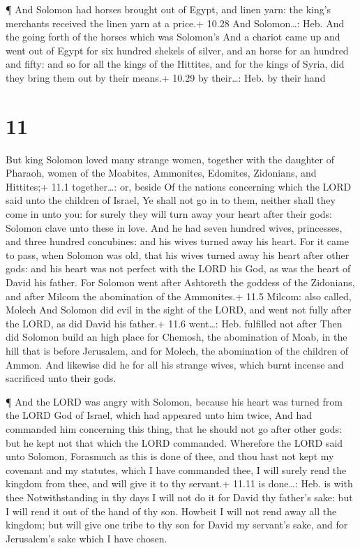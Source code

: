  ¶ And Solomon had horses brought out of Egypt, and linen
yarn: the king's merchants received the linen yarn at a price.+ 10.28
And Solomon\ldots: Heb. And the going forth of the horses which was
Solomon's  And a chariot came up and went out of Egypt for
six hundred shekels of silver, and an horse for an hundred and fifty:
and so for all the kings of the Hittites, and for the kings of Syria,
did they bring them out by their means.+ 10.29 by their\ldots: Heb. by
their hand

\hypertarget{section-10}{%
\section{11}\label{section-10}}

 But king Solomon loved many strange women, together with
the daughter of Pharaoh, women of the Moabites, Ammonites, Edomites,
Zidonians, and Hittites;+ 11.1 together\ldots: or, beside 
Of the nations concerning which the LORD said unto the children of
Israel, Ye shall not go in to them, neither shall they come in unto you:
for surely they will turn away your heart after their gods: Solomon
clave unto these in love.  And he had seven hundred wives,
princesses, and three hundred concubines: and his wives turned away his
heart.  For it came to pass, when Solomon was old, that his
wives turned away his heart after other gods: and his heart was not
perfect with the LORD his God, as was the heart of David his father.
 For Solomon went after Ashtoreth the goddess of the
Zidonians, and after Milcom the abomination of the Ammonites.+ 11.5
Milcom: also called, Molech  And Solomon did evil in the
sight of the LORD, and went not fully after the LORD, as did David his
father.+ 11.6 went\ldots: Heb. fulfilled not after  Then did
Solomon build an high place for Chemosh, the abomination of Moab, in the
hill that is before Jerusalem, and for Molech, the abomination of the
children of Ammon.  And likewise did he for all his strange
wives, which burnt incense and sacrificed unto their gods.

 ¶ And the LORD was angry with Solomon, because his heart
was turned from the LORD God of Israel, which had appeared unto him
twice,  And had commanded him concerning this thing, that
he should not go after other gods: but he kept not that which the LORD
commanded.  Wherefore the LORD said unto Solomon, Forasmuch
as this is done of thee, and thou hast not kept my covenant and my
statutes, which I have commanded thee, I will surely rend the kingdom
from thee, and will give it to thy servant.+ 11.11 is done\ldots: Heb.
is with thee  Notwithstanding in thy days I will not do it
for David thy father's sake: but I will rend it out of the hand of thy
son.  Howbeit I will not rend away all the kingdom; but
will give one tribe to thy son for David my servant's sake, and for
Jerusalem's sake which I have chosen.

